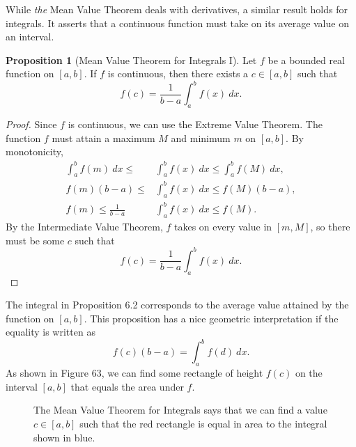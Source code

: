 \documentclass{article}
\newcommand{\R}{\mathbb{R}}
\theoremstyle{definition}
\newtheorem{proposition}{Proposition}[section]
\begin{document}
While \textit{the } Mean Value Theorem deals with derivatives, a similar result holds for integrals. It asserts that a continuous function must take on its average value on an interval.
\begin{proposition}[Mean Value Theorem for Integrals I]
Let $ f $ be a bounded real function on $ [a,b] $. If $ f $ is continuous, then there exists a $ c\in[a,b] $ such that $$f(c)=\frac{1}{b-a}\int_{a}^{b}f(x)\ dx.$$	
\end{proposition}
\begin{proof}
	Since $ f $ is continuous, we can use the Extreme Value Theorem. The function $ f $ must attain a maximum $ M $ and minimum $ m $ on $ [a,b] $. By monotonicity, 
	\begin{align*}
		\int_{a}^{b}f(m)\ dx\le &\int_{a}^{b}f(x)\ dx\le \int_{a}^{b}f(M)\ dx,\\
		f(m)(b-a)\le &\int_{a}^{b}f(x)\ dx\le f(M)(b-a),\\
		f(m)\le \frac{1}{b-a}&\int_{a}^{b}f(x)\ dx\le f(M).
	\end{align*}
	By the Intermediate Value Theorem, $ f $ takes on every value in $ [m,M] $, so there must be some $ c $ such that $$f(c)=\frac{1}{b-a}\int_{a}^{b}f(x)\ dx.$$
\end{proof}
The integral in Proposition 6.2 corresponds to the average value attained by the function on $ [a,b] $. This proposition has a nice geometric interpretation if the equality is written as $$ f(c)(b-a)=\int_{a}^{b}f(d)\ dx.$$ As shown in Figure 63, we can find some rectangle of height $ f(c) $ on the interval $ [a,b] $ that equals the area under $ f $. 
\begin{figure}[h!]
	\centering
	\caption{ The Mean Value Theorem for Integrals says that we can find a value $ c\in[a,b] $ such that the red rectangle is equal in area to the integral shown in blue.}
\end{figure}
\end{document}

